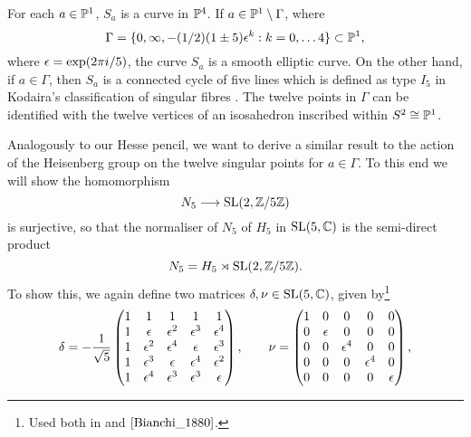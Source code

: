 \begin{prop}
	For each $a \in \mathbb{P}^{1}$, $S_{a}$ is a curve in $\mathbb{P}^{4}$. If $a \in \mathbb{P}^{1}\setminus\Gamma$, where
	\begin{equation*}
		\Gamma = \{0,\infty, -(1/2)(1\pm 5)\epsilon^{k} : k = 0,\ldots 4\} \subset \mathbb{P}^{1},
	\end{equation*}
	where $\epsilon = \exp(2\pi i /5)$, the curve $S_{a}$ is a smooth elliptic curve. On the other hand, if $a \in \Gamma$, then $S_{a}$ is a connected cycle of five lines which is defined as type $I_{5}$ in Kodaira's classification of singular fibres \cite{Kodaira_1963}. The twelve points in $\Gamma$ can be identified with the twelve vertices of an isosahedron inscribed within $S^{2} \cong \mathbb{P}^{1}$.
\end{prop}

Analogously to our Hesse pencil, we want to derive a similar result to the action of the Heisenberg group on the twelve singular points for $a \in \Gamma$. To this end we will show the homomorphism
\begin{equation*}
	N_{5} \longrightarrow \operatorname{SL}(2,\mathbb{Z}/5\mathbb{Z})
\end{equation*}
is surjective, so that the normaliser of $N_{5}$ of $H_{5}$ in $\operatorname{SL}(5,\mathbb{C})$ is the semi-direct product
\begin{equation*}
	N_{5} = H_{5} \rtimes \operatorname{SL}(2,\mathbb{Z}/5\mathbb{Z}).
\end{equation*}
To show this, we again define two matrices $\delta,\nu\in \operatorname{SL}(5,\mathbb{C})$, given by\footnote{Used both in \cite{Horrocks_1973} and $\cite{Bianchi_1880}$.}
\begin{equation*}
\delta = -\frac{1}{\sqrt{5}}\begin{pmatrix}
1 & 1 & 1 & 1 & 1\\
1 & \epsilon & \epsilon^{2} & \epsilon^{3} & \epsilon^{4}\\
1 & \epsilon^{2} & \epsilon^{4} & \epsilon & \epsilon^{3}\\
1 & \epsilon^{3} & \epsilon & \epsilon^{4} & \epsilon^{2}\\
1 & \epsilon^{4} & \epsilon^{3} & \epsilon^{3} & \epsilon\\
\end{pmatrix},
\qquad
\nu = \begin{pmatrix}
1 & 0 & 0 & 0 & 0\\
0 & \epsilon & 0 & 0 & 0\\
0 & 0 & \epsilon^{4} & 0 & 0\\
0 & 0 & 0 & \epsilon ^{4} & 0\\
0 & 0 & 0 & 0 & \epsilon
\end{pmatrix},
\end{equation*}
